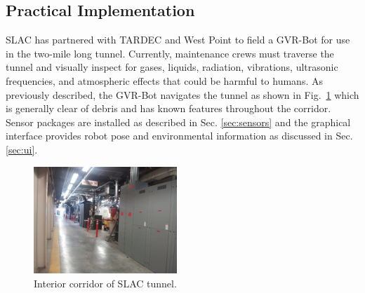 \subsection{Practical Implementation}\label{sec:practical}

SLAC has partnered with TARDEC and West Point to field a GVR-Bot for use in the two-mile long tunnel. Currently, maintenance crews must traverse the tunnel and visually inspect for gases, liquids, radiation, vibrations, ultrasonic frequencies, and atmospheric effects that could be harmful to humans. As previously described, the GVR-Bot navigates the tunnel as shown in Fig.~\ref{fig:tunnel} which is generally clear of debris and has known features throughout the corridor. Sensor packages are installed as described in Sec. \ref{sec:sensors} and the graphical interface provides robot pose and environmental information as discussed in Sec. \ref{sec:ui}.

\begin{figure}
	\centering
	\includegraphics[width=0.48\textwidth]{./pictures/slac-tunnel.jpg}
	\caption{Interior corridor of SLAC tunnel.}
	\label{fig:tunnel}
\end{figure}
